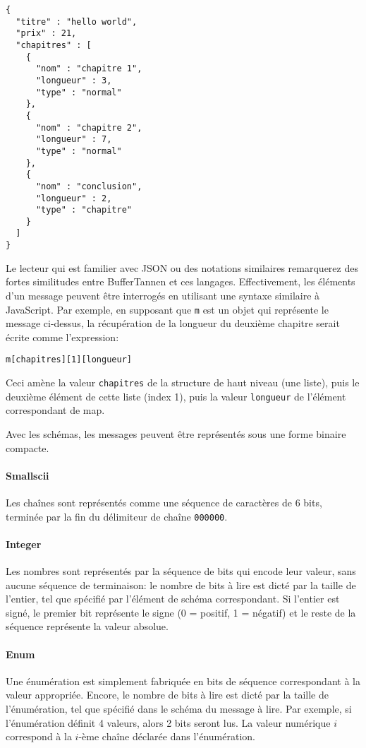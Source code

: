 \begin{verbatim}
{
  "titre" : "hello world",
  "prix" : 21,
  "chapitres" : [
    {
      "nom" : "chapitre 1",
      "longueur" : 3,
      "type" : "normal"
    },
    {
      "nom" : "chapitre 2",
      "longueur" : 7,
      "type" : "normal"
    },
    {
      "nom" : "conclusion",
      "longueur" : 2,
      "type" : "chapitre"
    }
  ]
}
\end{verbatim}

Le lecteur qui est familier avec JSON ou des notations similaires remarquerez des fortes similitudes entre BufferTannen et ces langages. Effectivement, les éléments d'un message peuvent être interrogés en utilisant une syntaxe similaire à JavaScript. Par exemple, en supposant que \verb+m+ est un objet qui représente le message ci-dessus, la récupération de la longueur du deuxième chapitre serait écrite comme l'expression:

\begin{verbatim}
m[chapitres][1][longueur]
\end{verbatim}

Ceci amène la valeur \verb+chapitres+ de la structure de haut niveau (une liste), puis le deuxième élément de cette liste (index 1), puis la valeur \verb+longueur+ de l'élément correspondant de map.

Avec les schémas, les messages peuvent être représentés sous une forme binaire compacte.

\paragraph{Smallscii} Les chaînes sont représentés comme une séquence de caractères de 6 bits, terminée par la fin du délimiteur de chaîne \verb+000000+.

\paragraph{Integer} Les nombres sont représentés par la séquence de bits qui encode leur valeur, sans aucune séquence de terminaison: le nombre de bits à lire est dicté par la taille de l'entier, tel que spécifié par l'élément de schéma correspondant. Si l'entier est signé, le premier bit représente le signe (0 = positif, 1 = négatif) et le reste de la séquence représente la valeur absolue.

\paragraph{Enum} Une énumération est simplement fabriquée en bits de séquence correspondant à la valeur appropriée. Encore, le nombre de bits à lire est dicté par la taille de l'énumération, tel que spécifié dans le schéma du message à lire. Par exemple, si l'énumération définit 4 valeurs, alors 2 bits seront lus. La valeur numérique $i$ correspond à la $i$-ème chaîne déclarée dans l'énumération.

